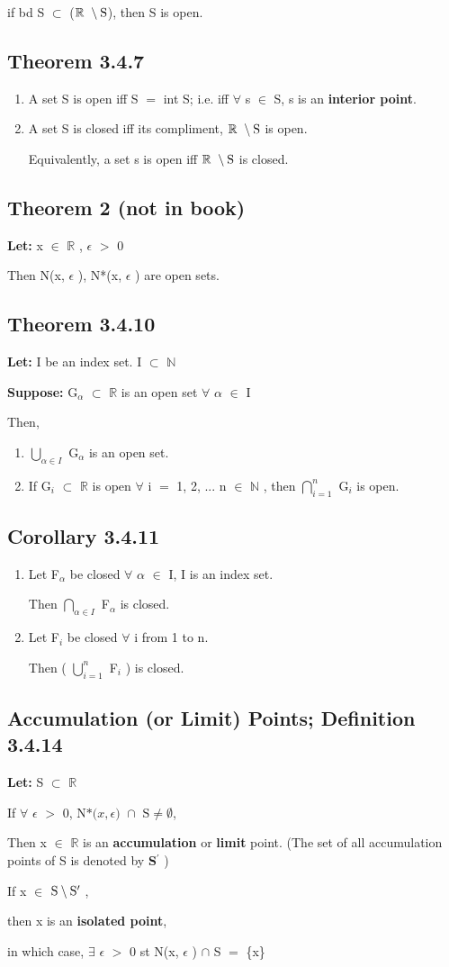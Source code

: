 \documentclass{article}
\newcommand{\mt}[1]{\ensuremath{#1}}
\newcommand\ssc[2][\DefaultOpt]{%
  \def\DefaultOpt{#2}%
  \subsection[#1]{#2}%
}
\newcommand{\balist}{\begin{enumerate}[label=\alph*.]}
\newcommand{\elist}{\end{enumerate}}
\newcommand{\lt}[1]{\textbf{Let: } #1}
\newcommand{\supp}[1]{\textbf{Suppose: } #1}
\newcommand{\br}{\mt{\mathbb{R}} }       %
\newcommand{\bn}{\mt{\mathbb{N}} }       %
\newcommand{\ep}{\mt{\epsilon} }         %
\newcommand{\fa}{\mt{\forall} }          %
\newcommand{\afa}{\mt{\alpha} }
\newcommand{\mem}{\mt{\in} }
\newcommand{\exs}{\mt{\exists} }
\newcommand{\sbs}{\mt{\subset} }         %
\newcommand{\eql}{\mt{=} }
\newcommand{\pr}{\mt{^\prime} } 		   %
\newcommand{\uw}[2]{#1\mt{_{#2}}}
\newcommand{\bnt}[2]{\mt{\textrm{#1}\setminus{\textrm{#2}}}}
\newcommand{\urng}[2]{\mt{\bigcup_{#1}^{#2}}}
\newcommand{\nrng}[2]{\mt{\bigcap_{#1}^{#2}}}
\newcommand{\dnbho}[3]{\textrm{N*(}#1, #2\textrm{) }\cap \textrm{ #3} \neq \emptyset}
\begin{document}
{{{	if bd S \sbs (\bnt{\br}{S}), then S is open.

}


\ssc{Theorem 3.4.7}{

\balist
\item A set S is open iff S \eql int S; i.e. iff \fa s \mem S, s is an \textbf{interior point}.
\item A set S is closed iff its compliment, \bnt{\br}{S} is open.

	Equivalently, a set s is open iff \bnt{\br}{S} is closed.
	
\elist
}

\ssc{Theorem 2 (not in book)}{

\lt{x \mem \br, \ep $>$ 0}

Then N(x, \ep), N*(x, \ep) are open sets.
}

\ssc{Theorem 3.4.10}{

\lt{I be an index set. I \sbs \bn}

\supp{\uw{G}{\afa} \sbs \br is an open set \fa \afa \mem I}

Then, 

\balist
\item \urng{\afa \mem I}{} \uw{G}{\afa} is an open set.
\item If \uw{G}{i} \sbs \br is open \fa i \eql 1, 2, ... n \mem \bn, then \nrng{i = 1}{n} \uw{G}{i} is open.
\elist

}

\ssc{Corollary 3.4.11}{

\balist
\item Let \uw{F}{\afa} be closed \fa \afa \mem I, I is an index set.

	Then \nrng{\afa \mem I}{} \uw{F}{\afa} is closed.
\item Let \uw{F}{i} be closed \fa i from 1 to n.
	
	Then ( \urng{i = 1}{n} \uw{F}{i} ) is closed.
\elist
}

\ssc{Accumulation (or Limit) Points; Definition 3.4.14}{

\lt{S \sbs \br}

If \fa \ep $>$ 0, $\dnbho{x}{\ep}{S}$,

Then x \mem \br is an \textbf{accumulation} or \textbf{limit} point. (The set of all accumulation points of S is denoted by \textbf{S\pr})

If x \mem \bnt{S}{S\pr},

then x is an \textbf{isolated point},

in which case, \exs \ep $>$ 0 st N(x, \ep) $\cap$ S \eql \{x\}

}}}
\end{document}
